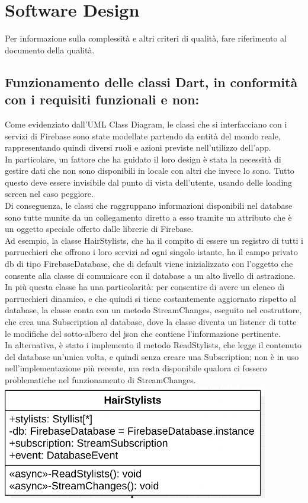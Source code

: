 \documentclass{article}
\begin{document}
\section{Software Design}
Per informazione sulla complessità e altri criteri di qualità, fare riferimento al documento della qualità.
\subsection{Funzionamento delle classi Dart, in conformità con i requisiti funzionali e non:}
Come evidenziato dall’UML Class Diagram, le classi che si interfacciano con i servizi di Firebase sono state modellate partendo da entità del mondo reale, rappresentando quindi diversi ruoli e azioni previste nell’utilizzo dell’app. 
\\In particolare, un fattore che ha guidato il loro design è stata la necessità di gestire dati che non sono disponibili in locale con altri che invece lo sono. Tutto questo deve essere invisibile dal punto di vista dell’utente, usando delle loading screen nel caso peggiore. 
\\Di conseguenza, le classi che raggruppano informazioni disponibili nel database sono tutte munite da un collegamento diretto a esso tramite un attributo che è un oggetto speciale offerto dalle librerie di Firebase.
\\Ad esempio, la classe HairStylists, che ha il compito di essere un registro di tutti i parrucchieri che offrono i loro servizi ad ogni singolo istante, ha il campo privato db di tipo FirebaseDatabase, che di default viene inizializzato con l’oggetto che consente alla classe di comunicare con il database a un alto livello di astrazione. In più questa classe ha una particolarità: per consentire di avere un elenco di parrucchieri dinamico, e che quindi si tiene costantemente aggiornato rispetto al database, la classe conta con un metodo StreamChanges, eseguito nel costruttore, che crea una Subscription al database, dove la classe diventa un listener di tutte le modifiche del sotto-albero del json che contiene l’informazione pertinente.
\\In alternativa, è stato i implemento il metodo ReadStylists, che legge il contenuto del database un’unica volta, e quindi senza creare una Subscription; non è in uso nell’implementazione più recente, ma resta disponibile qualora ci fossero problematiche nel funzionamento di StreamChanges. 
\\ \includegraphics{Immagini/CalsseHairStylists.png} 
\end{document}
